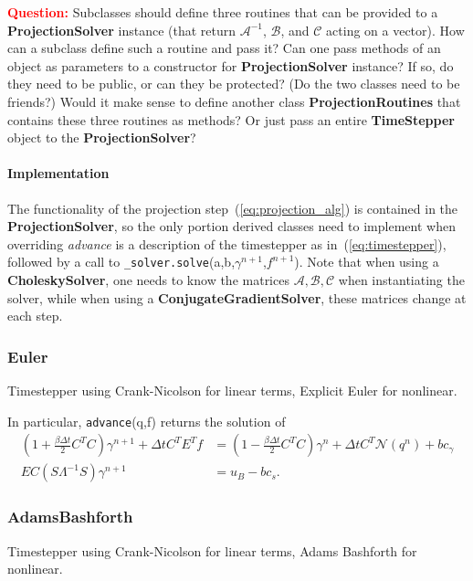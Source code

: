 \documentclass[11pt]{article}
\def\question#1{\textcolor{red}{\bf Question:} #1}
\def\class#1{{\bf #1}} %
\def\fn#1{{\tt #1}} %
\def\virtualfn#1{{\it #1}} %
\begin{document}
\question{Subclasses should define three routines that can be provided to a \class{ProjectionSolver} instance (that return $\mathcal{A}^{-1}$, $\mathcal{B}$, and $\mathcal{C}$ acting on a vector).  How can a subclass define such a routine and pass it?  Can one pass methods of an object as parameters to a constructor for \class{ProjectionSolver} instance?  If so, do they need to be public, or can they be protected? (Do the two classes need to be friends?)  Would it make sense to define another class \class{ProjectionRoutines} that contains these three routines as methods?  Or just pass an entire \class{TimeStepper} object to the \class{ProjectionSolver}?}

\paragraph{Implementation}
The functionality of the projection step~(\ref{eq:projection_alg}) is contained in the \class{ProjectionSolver}, so the only portion derived classes need to implement when overriding \virtualfn{advance} is a description of the timestepper as in~(\ref{eq:timestepper}), followed by a call to \fn{\_solver.solve}(a,b,$\gamma^{n+1}$,$f^{n+1}$).  Note that when using a \class{CholeskySolver}, one needs to know the matrices $\mathcal{A,B,C}$ when instantiating the solver, while when using a \class{ConjugateGradientSolver}, these matrices change at each step.

\subsubsection{Euler}
Timestepper using Crank-Nicolson for linear terms, Explicit Euler for nonlinear.

In particular, \fn{advance}(q,f) returns the solution of
	\begin{align}
		\left(1+\frac{\beta\Delta t}{2}C^TC\right)\gamma^{n+1} + \Delta t C^TE^Tf &= \left(1 - \frac{\beta\Delta t}{2}C^TC\right)\gamma^n + \Delta t C^T \mathcal{N}(q^n) + bc_\gamma \\
		EC(S\Lambda^{-1}S)\gamma^{n+1} &= u_B - bc_s.
	\end{align}

\subsubsection{AdamsBashforth}
Timestepper using Crank-Nicolson for linear terms, Adams Bashforth for nonlinear.
\end{document}
